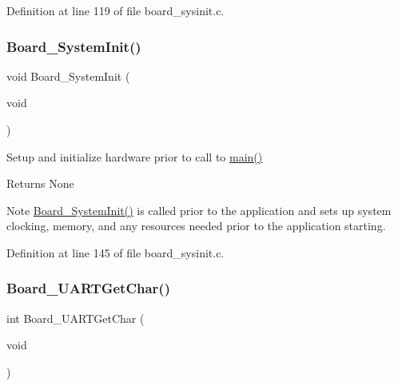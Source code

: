 Definition at line 119 of file board\+\_\+sysinit.\+c.

\mbox{\label{group___b_o_a_r_d___c_o_m_m_o_n___a_p_i_gaeb60ea85499a4208167ae2540086516a}} 
\subsubsection{\texorpdfstring{Board\+\_\+\+System\+Init()}{Board\_SystemInit()}}
{\footnotesize\ttfamily void Board\+\_\+\+System\+Init (\begin{DoxyParamCaption}\item[{void}]{ }\end{DoxyParamCaption})}



Setup and initialize hardware prior to call to \hyperlink{group__samples_ga840291bc02cba5474a4cb46a9b9566fe}{main()} 

\begin{DoxyReturn}{Returns}
None 
\end{DoxyReturn}
\begin{DoxyNote}{Note}
\hyperlink{group___b_o_a_r_d___c_o_m_m_o_n___a_p_i_gaeb60ea85499a4208167ae2540086516a}{Board\+\_\+\+System\+Init()} is called prior to the application and sets up system clocking, memory, and any resources needed prior to the application starting. 
\end{DoxyNote}


Definition at line 145 of file board\+\_\+sysinit.\+c.

\mbox{\label{group___b_o_a_r_d___c_o_m_m_o_n___a_p_i_ga4cffd2ff35f970b7dfad4fdf6419ecf6}} 
\subsubsection{\texorpdfstring{Board\+\_\+\+U\+A\+R\+T\+Get\+Char()}{Board\_UARTGetChar()}}
{\footnotesize\ttfamily int Board\+\_\+\+U\+A\+R\+T\+Get\+Char (\begin{DoxyParamCaption}\item[{void}]{ }\end{DoxyParamCaption})}




